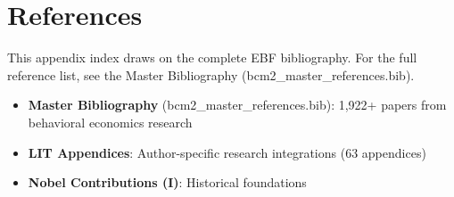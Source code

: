 \section{References}
\label{sec:index-references}

This appendix index draws on the complete EBF bibliography. For the full reference list, see the Master Bibliography (bcm2\_master\_references.bib).

\nocite{bcm_master}

\begin{itemize}[nosep]
\item \textbf{Master Bibliography} (bcm2\_master\_references.bib): 1,922+ papers from behavioral economics research
\item \textbf{LIT Appendices}: Author-specific research integrations (63 appendices)
\item \textbf{Nobel Contributions (I)}: Historical foundations
\end{itemize}



